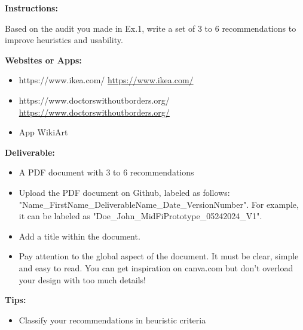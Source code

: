\makeheaderfiles

\textbf{Instructions:}

Based on the audit you made in Ex.1, write a set of 3 to 6 recommendations to improve heuristics and usability.

\textbf{Websites or Apps:}

\begin{itemize}
\item https://www.ikea.com/ \url{https://www.ikea.com/}
\item https://www.doctorswithoutborders.org/ \url{https://www.doctorswithoutborders.org/}
\item App WikiArt
\end{itemize}

\textbf{Deliverable:}

\begin{itemize}
\item A PDF document with 3 to 6 recommendations
\item Upload the PDF document on Github, labeled as follows: "Name\_FirstName\_DeliverableName\_Date\_VersionNumber". For example, it can be labeled as "Doe\_John\_MidFiPrototype\_05242024\_V1".
\item Add a title within the document.
\item Pay attention to the global aspect of the document. It must be clear, simple and easy to read. You can get inspiration on canva.com but don't overload your design with too much details!
\end{itemize}

\textbf{Tips:}

\begin{itemize}
\item Classify your recommendations in heuristic criteria
\end{itemize}

